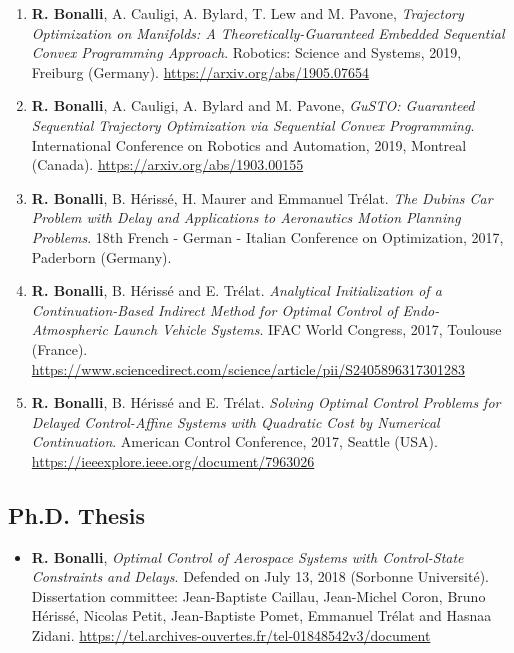 \documentclass[a4paper,12pt]{article}
\begin{document}
\begin{enumerate}
\item \textbf{R. Bonalli}, A. Cauligi, A. Bylard, T. Lew and M. Pavone, \textit{Trajectory Optimization on Manifolds: A Theoretically-Guaranteed Embedded Sequential Convex Programming Approach}. Robotics: Science and Systems, 2019, Freiburg (Germany). \url{https://arxiv.org/abs/1905.07654}
\item \textbf{R. Bonalli}, A. Cauligi, A. Bylard and M. Pavone, \textit{GuSTO: Guaranteed Sequential Trajectory Optimization via Sequential Convex Programming}. International Conference on Robotics and Automation, 2019, Montreal (Canada). \url{https://arxiv.org/abs/1903.00155}
\item \textbf{R. Bonalli}, B. H\'{e}riss\'{e}, H. Maurer and Emmanuel Tr\'{e}lat. \textit{The Dubins Car Problem with Delay and Applications to Aeronautics Motion Planning Problems}. 18th French - German - Italian Conference on Optimization, 2017, Paderborn (Germany).
\item \textbf{R. Bonalli}, B. H\'{e}riss\'{e} and E. Tr\'{e}lat. \textit{Analytical Initialization of a Continuation-Based Indirect Method for Optimal Control of Endo-Atmospheric Launch Vehicle Systems}. IFAC World Congress, 2017, Toulouse (France). \url{https://www.sciencedirect.com/science/article/pii/S2405896317301283}
\item \textbf{R. Bonalli}, B. H\'{e}riss\'{e} and E. Tr\'{e}lat. \textit{Solving Optimal Control Problems for Delayed Control-Affine Systems with Quadratic Cost by Numerical Continuation}. American Control Conference, 2017, Seattle (USA). \url{https://ieeexplore.ieee.org/document/7963026}
\end{enumerate}

\subsection{Ph.D. Thesis}

\begin{itemize}
\item \textbf{R. Bonalli}, \textit{Optimal Control of Aerospace Systems with Control-State Constraints and Delays}. Defended on July 13, 2018 (Sorbonne Universit\'e). Dissertation committee: Jean-Baptiste Caillau, Jean-Michel Coron, Bruno H\'eriss\'e, Nicolas Petit, Jean-Baptiste Pomet, Emmanuel Tr\'elat and Hasnaa Zidani. \url{https://tel.archives-ouvertes.fr/tel-01848542v3/document}
\end{itemize}
\end{document}
